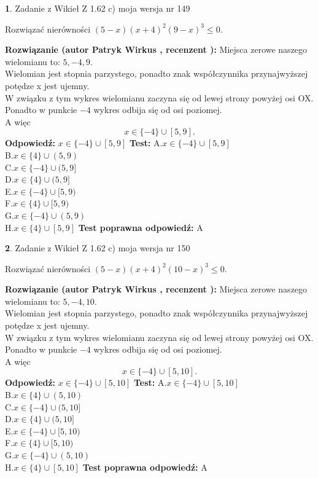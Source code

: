 \documentclass[12pt, a4paper]{article}
\theoremstyle{definition} %
\newtheorem{zad}{}
\newcommand{\zadStart}[1]{\begin{zad}#1\newline}
\newcommand{\zadStop}{\end{zad}}
\newcommand{\rozwStart}[2]{\noindent \textbf{Rozwiązanie (autor #1 , recenzent #2): }\newline}
\newcommand{\rozwStop}{\newline}
\newcommand{\odpStart}{\noindent \textbf{Odpowiedź:}\newline}
\newcommand{\odpStop}{\newline}
\newcommand{\testStart}{\noindent \textbf{Test:}\newline}
\newcommand{\testStop}{\newline}
\newcommand{\kluczStart}{\noindent \textbf{Test poprawna odpowiedź:}\newline}
\newcommand{\kluczStop}{\newline}
\begin{document}
\zadStart{Zadanie z Wikieł Z 1.62 c) moja wersja nr 149}

Rozwiązać nierówności $(5-x)(x+4)^{2}(9-x)^{3}\le0$.
\zadStop
\rozwStart{Patryk Wirkus}{}
Miejsca zerowe naszego wielomianu to: $5, -4, 9$.\\
Wielomian jest stopnia parzystego, ponadto znak współczynnika przy\linebreak najwyższej potędze x jest ujemny.\\ W związku z tym wykres wielomianu zaczyna się od lewej strony powyżej osi OX.\\
Ponadto w punkcie $-4$ wykres odbija się od osi poziomej.\\
A więc $$x \in \{-4\} \cup [5,9].$$
\rozwStop
\odpStart
$x \in \{-4\} \cup [5,9]$
\odpStop
\testStart
A.$x \in \{-4\} \cup [5,9]$\\
B.$x \in \{4\} \cup (5,9)$\\
C.$x \in \{-4\} \cup (5,9]$\\
D.$x \in \{4\} \cup (5,9]$\\
E.$x \in \{-4\} \cup [5,9)$\\
F.$x \in \{4\} \cup [5,9)$\\
G.$x \in \{-4\} \cup (5,9)$\\
H.$x \in \{4\} \cup [5,9]$
\testStop
\kluczStart
A
\kluczStop



\zadStart{Zadanie z Wikieł Z 1.62 c) moja wersja nr 150}

Rozwiązać nierówności $(5-x)(x+4)^{2}(10-x)^{3}\le0$.
\zadStop
\rozwStart{Patryk Wirkus}{}
Miejsca zerowe naszego wielomianu to: $5, -4, 10$.\\
Wielomian jest stopnia parzystego, ponadto znak współczynnika przy\linebreak najwyższej potędze x jest ujemny.\\ W związku z tym wykres wielomianu zaczyna się od lewej strony powyżej osi OX.\\
Ponadto w punkcie $-4$ wykres odbija się od osi poziomej.\\
A więc $$x \in \{-4\} \cup [5,10].$$
\rozwStop
\odpStart
$x \in \{-4\} \cup [5,10]$
\odpStop
\testStart
A.$x \in \{-4\} \cup [5,10]$\\
B.$x \in \{4\} \cup (5,10)$\\
C.$x \in \{-4\} \cup (5,10]$\\
D.$x \in \{4\} \cup (5,10]$\\
E.$x \in \{-4\} \cup [5,10)$\\
F.$x \in \{4\} \cup [5,10)$\\
G.$x \in \{-4\} \cup (5,10)$\\
H.$x \in \{4\} \cup [5,10]$
\testStop
\kluczStart
A
\kluczStop
\end{document}
